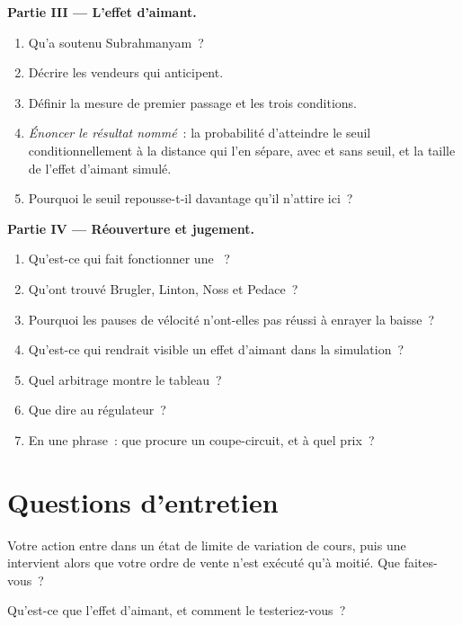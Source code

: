 \begin{problem}
\medskip\noindent\textbf{Partie III --- L'effet d'aimant.}
\begin{enumerate}[resume]
\item Qu'a soutenu Subrahmanyam~?
\item Décrire les vendeurs qui anticipent.
\item Définir la mesure de premier passage et les trois conditions.
\item \emph{Énoncer le résultat nommé}~: la probabilité d'atteindre le seuil conditionnellement à la distance qui l'en sépare, avec et sans seuil, et la taille de
l'effet d'aimant simulé.
\item Pourquoi le seuil repousse-t-il davantage qu'il n'attire ici~?
\end{enumerate}

\medskip\noindent\textbf{Partie IV --- Réouverture et jugement.}
\begin{enumerate}[resume]
\item Qu'est-ce qui fait fonctionner une ~?
\item Qu'ont trouvé Brugler, Linton, Noss et Pedace~?
\item Pourquoi les pauses de vélocité n'ont-elles pas réussi à enrayer la baisse~?
\item Qu'est-ce qui rendrait visible un effet d'aimant dans la simulation~?
\item Quel arbitrage montre le tableau~?
\item Que dire au régulateur~?
\item En une phrase~: que procure un coupe-circuit, et à quel prix~?
\end{enumerate}
\end{problem}

\section{Questions d'entretien}

\begin{interviewq}\label{iq:mx:circuit-breakers-and-halts:1}
Votre action entre dans un état de limite de variation de cours, puis une  intervient alors que votre ordre de vente n'est exécuté qu'à moitié. Que faites-vous~?
\end{interviewq}

\begin{interviewq}\label{iq:mx:circuit-breakers-and-halts:2}
Qu'est-ce que l'effet d'aimant, et comment le testeriez-vous~?
\end{interviewq}

